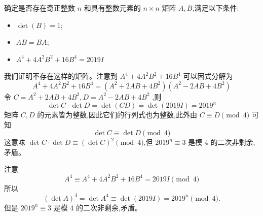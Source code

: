 \begin{questions}
    \question 确定是否存在奇正整数 $n$ 和具有整数元素的 $n \times n$ 矩阵 $A,B$,满足以下条件:
    \begin{itemize}
        \item $\det(B) = 1$;
        \item $AB = BA$;
        \item $A^4 + 4A^2B^2 + 16B^4 = 2019I$
    \end{itemize}
    \begin{solution}
        我们证明不存在这样的矩阵。注意到 $A^4 + 4A^2B^2 + 16B^4$ 可以因式分解为
        \[
        A^4 + 4A^2B^2 + 16B^4 = (A^2 + 2AB + 4B^2)(A^2 - 2AB + 4B^2)
        \]
        令 $C = A^2 + 2AB + 4B^2,D = A^2 - 2AB + 4B^2$ ,则
        \[
        \det C \cdot \det D = \det(CD) = \det(2019I) = 2019^n
        \]
        矩阵 $C, D$ 的元素皆为整数,因此它们的行列式也为整数,此外由 $C \equiv D \pmod 4$ 可知
        \[
        \det C \equiv \det D \pmod 4
        \]
        这意味 $\det C \cdot \det D \equiv (\det C)^2 \pmod 4$,但 $2019^n \equiv 3$ 是模 $4$ 的二次非剩余,矛盾。
    \end{solution}
    \begin{solution}
        注意
        \[ 
        A^4 \equiv A^4 + 4A^2B^2 + 16B^4 = 2019I \pmod{4} 
        \]
        所以
        \[ 
        (\det A)^4 = \det A^4 \equiv \det(2019I) = 2019^n \pmod{4}. 
        \]
        但是 $2019^n \equiv 3$ 是模 $4$ 的二次非剩余,矛盾。
    \end{solution}


\end{questions}
